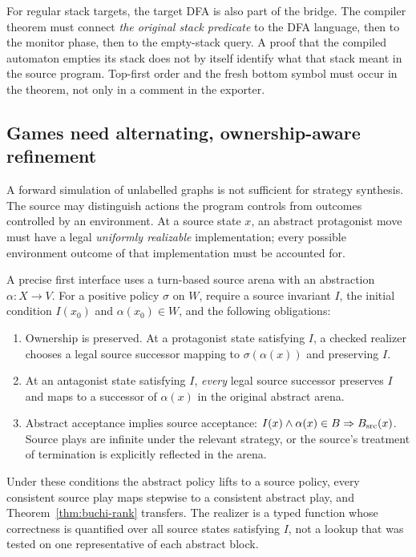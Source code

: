 For regular stack targets, the target DFA is also part of the bridge. The
compiler theorem must connect \emph{the original stack predicate} to the DFA
language, then to the monitor phase, then to the empty-stack query. A proof that
the compiled automaton empties its stack does not by itself identify what that
stack meant in the source program. Top-first order and the fresh bottom symbol
must occur in the theorem, not only in a comment in the exporter.

\subsection{Games need alternating, ownership-aware refinement}
A forward simulation of unlabelled graphs is not sufficient for strategy
synthesis. The source may distinguish actions the program controls from
outcomes controlled by an environment. At a source state $x$, an abstract
protagonist move must have a legal \emph{uniformly realizable} implementation;
every possible environment outcome of that implementation must be accounted
for.

A precise first interface uses a turn-based source arena with an abstraction
$\alpha:X\to V$. For a positive policy $\sigma$ on $W$, require a source
invariant $I$, the initial condition $I(x_0)$ and $\alpha(x_0)\in W$, and the
following obligations:
\begin{enumerate}
\item Ownership is preserved. At a protagonist state satisfying $I$, a
  checked realizer chooses a legal source successor mapping to
  $\sigma(\alpha(x))$ and preserving $I$.
\item At an antagonist state satisfying $I$, \emph{every} legal source
  successor preserves $I$ and maps to a successor of $\alpha(x)$ in the
  original abstract arena.
\item Abstract acceptance implies source acceptance:
  $I(x)\wedge\alpha(x)\in B\Rightarrow B_{\rm src}(x)$.
  Source plays are infinite under the relevant strategy, or the source's
  treatment of termination is explicitly reflected in the arena.
\end{enumerate}
Under these conditions the abstract policy lifts to a source policy, every
consistent source play maps stepwise to a consistent abstract play, and
Theorem~\ref{thm:buchi-rank} transfers. The realizer is a typed function whose
correctness is quantified over all source states satisfying $I$, not a lookup
that was tested on one representative of each abstract block.

